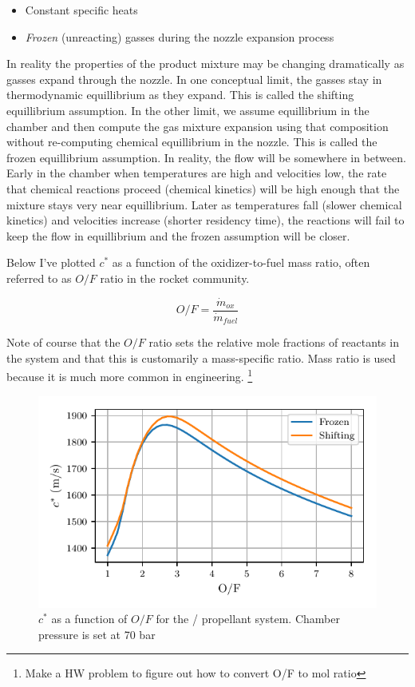 \documentclass[twocolumn]{memoir} %
\begin{document}
\begin{itemize}
    \item Constant specific heats
    \item \emph{Frozen} (unreacting) gasses during the nozzle expansion process
\end{itemize}
%
In reality the properties of the product mixture may be changing dramatically as gasses
expand through the nozzle.  In one conceptual limit, the gasses stay in thermodynamic 
equillibrium as they expand.  This is called the shifting equillibrium assumption.  In the
other limit, we assume equillibrium in the chamber and then compute the gas mixture
expansion using that composition without re-computing chemical equillibrium in the nozzle.
This is called the frozen equillibrium assumption.  In reality, the flow will be somewhere
in between.  Early in the chamber when temperatures are high and velocities low, the
rate that chemical reactions proceed (chemical kinetics) will be high enough that the 
mixture stays very near equillibrium.  Later as temperatures fall (slower chemical 
kinetics) and velocities increase (shorter residency time), the reactions will fail
to keep the flow in equillibrium and the frozen assumption will be closer.

Below I've plotted $c^*$ as a function of the oxidizer-to-fuel mass ratio, often referred
to as $O/F$ ratio in the rocket community.  

\begin{equation}
    O/F = \frac{\dot{m}_{ox}}{\dot{m}_{fuel}}
\end{equation}

Note of course that the $O/F$ ratio sets the
relative mole fractions of reactants in the system and that this is customarily a
mass-specific ratio.  Mass ratio is used because it is much more common in engineering.
\footnote{Make a HW problem to figure out how to convert O/F to mol ratio}

\begin{figure}[H]
    \includegraphics[width=\columnwidth]{cstar_ppp}
    \caption{$c^*$ as a function of $O/F$ for the  /  propellant system.  
    Chamber pressure is set at 70 bar}
\end{figure}
\end{document}
